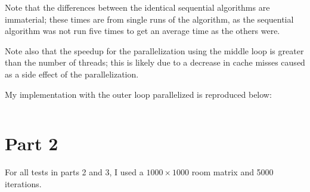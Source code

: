 \documentclass[12pt,letterpaper,oneside]{article}
\begin{document}
Note that the differences between the identical sequential algorithms are immaterial; these times are from single runs of the algorithm, as the sequential algorithm was not run five times to get an average time as the others were.

Note also that the speedup for the parallelization using the middle loop is greater than the number of threads; this is likely due to a decrease in cache misses caused as a side effect of the parallelization.

My implementation with the outer loop parallelized is reproduced below:
\inputminted[tabsize=2,fontsize=\small]{c}{part1-outer.c}

\section*{Part 2}
For all tests in parts 2 and 3, I used a $1000\times1000$ room matrix and 5000 iterations.
\end{document}
